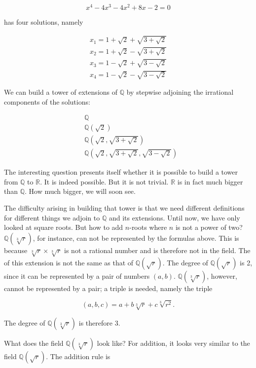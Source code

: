 \documentclass[tikz]{scrreprt}
\begin{document}
\begin{equation}
x^4 - 4x^3 - 4x^2 + 8x - 2 = 0
\end{equation}

has four solutions, namely

\begin{align*}
x_1 = 1 + \sqrt{2} + \sqrt{3 + \sqrt{2}}\\
x_2 = 1 + \sqrt{2} - \sqrt{3 + \sqrt{2}}\\
x_3 = 1 - \sqrt{2} + \sqrt{3 - \sqrt{2}}\\
x_4 = 1 - \sqrt{2} - \sqrt{3 - \sqrt{2}}
\end{align*}

We can build a tower of extensions of $\mathbb{Q}$ by
stepwise adjoining the irrational components of the solutions:

\begin{align*}
&\mathbb{Q}\\
&\mathbb{Q}\left(\sqrt{2}\right)\\
&\mathbb{Q}\left(\sqrt{2},\sqrt{3+\sqrt{2}}\right)\\
&\mathbb{Q}\left(\sqrt{2},\sqrt{3+\sqrt{2}},\sqrt{3-\sqrt{2}}\right)
\end{align*}

The interesting question presents itself whether it is possible
to build a tower from $\mathbb{Q}$ to $\mathbb{R}$.
It is indeed possible. But it is not trivial.
$\mathbb{R}$ is in fact much bigger than $\mathbb{Q}$.
How much bigger, we will soon see.

The difficulty arising in building that tower
is that we need different definitions for different
things we adjoin to $\mathbb{Q}$ and its extensions.
Until now, we have only looked at square roots.
But how to add $n$-roots where $n$ is not a power of two?
$\mathbb{Q}(\sqrt[3]{r})$, for instance, can not be represented
by the formulas above.
This is because $\sqrt[3]{r} \times \sqrt[3]{r}$
is not a rational number and is therefore not in the field.
The  of this extension is not the same as that of
$\mathbb{Q}(\sqrt{r})$.
The degree of 
$\mathbb{Q}(\sqrt{r})$ is 2, since it can be represented by a pair of numbers
$(a,b)$.
$\mathbb{Q}(\sqrt[3]{r})$, however, cannot be represented by a pair;
a triple is needed, namely the triple

\[
(a,b,c) = a + b\sqrt[3]{r} + c\sqrt[3]{r^2}.
\]

The degree of $\mathbb{Q}(\sqrt[3]{r})$ is therefore 3.

What does the field $\mathbb{Q}(\sqrt[3]{r})$ look like?
For addition, it looks very similar to the field $\mathbb{Q}(\sqrt{r})$.
The addition rule is
\end{document}
